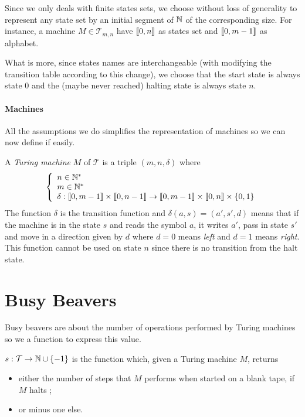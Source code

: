 \documentclass{report}
\begin{document}
Since we only deals with finite states sets, we choose without loss of generality to represent any state set by an initial segment of $\mathbb{N}$ of the corresponding size. For instance, a machine $M \in \mathcal{T}_{m,n}$ have $\llbracket 0, n \rrbracket$ as states set and $\llbracket 0, m-1 \rrbracket$ as alphabet.

What is more, since states names are interchangeable (with modifying the transition table according to this change), we choose that the start state is always state $0$ and the (maybe never reached) halting state is always state $n$.



\paragraph{Machines}
All the assumptions we do simplifies the representation of machines so we can now define if easily.

\begin{Def}

A \emph{Turing machine} $M$ of $\mathcal{T}$ is a triple $(m,n,\delta)$ where 
\[
\left \{
\begin{array}{l}
  n \in \mathbb{N}^*\\
  m \in \mathbb{N}^*\\
  \delta : \llbracket 0, m-1 \rrbracket \times \llbracket 0, n-1 \rrbracket \to \llbracket 0, m-1 \rrbracket \times \llbracket 0, n \rrbracket \times \{0,1\}
\end{array}
\right .
\]
The function $\delta$ is the transition function and $\delta(a, s) = (a', s', d)$ means that if the machine is in the state $s$ and reads the symbol $a$, it writes $a'$, pass in state $s'$ and move in a direction given by $d$ where $d = 0$ means \emph{left} and $d = 1$ means \emph{right}. This function cannot be used on state $n$ since there is no transition from the halt state.  
\end{Def}


\section{Busy Beavers}
\label{sec:bb}

Busy beavers are about the number of operations performed by Turing machines so we a function to express this value.
\begin{Def}[$s$ function]
  $s : \mathcal{T} \to \mathbb{N} \cup \{-1\}$ is the function which, given a Turing machine $M$, returns
  \begin{itemize}
  \item either the number of steps that $M$ performs when started on a blank tape, if $M$ halts ;
  \item or minus one else.
  \end{itemize}
\end{Def}
\end{document}
